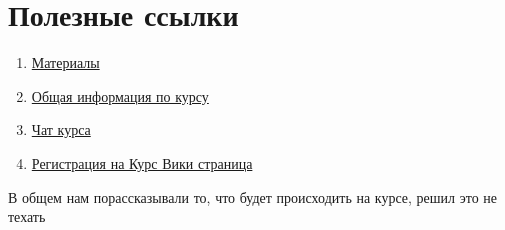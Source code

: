 
\section{Полезные ссылки}
\begin{enumerate}
    \item \href{https://akhpl.ru/tp2025-drive}{Материалы}
    \item \href{https://akhpl.ru/tp2025-channel}{Общая информация по курсу}
    \item \href{https://akhpl.ru/tp2025-chat}{Чат курса}
    \item \href{https://akhcheck.ru/system registration}{Регистрация на Курс Вики страница}
\end{enumerate}

В общем нам порассказывали то, что будет происходить на курсе, решил это не техать